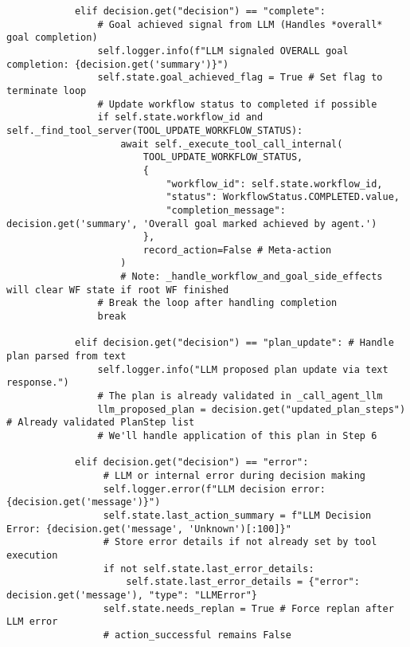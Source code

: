 \documentclass[12pt,a4paper]{article}
\begin{document}
\begin{pageablecode}
\begin{verbatim}
            elif decision.get("decision") == "complete":
                # Goal achieved signal from LLM (Handles *overall* goal completion)
                self.logger.info(f"LLM signaled OVERALL goal completion: {decision.get('summary')}")
                self.state.goal_achieved_flag = True # Set flag to terminate loop
                # Update workflow status to completed if possible
                if self.state.workflow_id and self._find_tool_server(TOOL_UPDATE_WORKFLOW_STATUS):
                    await self._execute_tool_call_internal(
                        TOOL_UPDATE_WORKFLOW_STATUS,
                        {
                            "workflow_id": self.state.workflow_id,
                            "status": WorkflowStatus.COMPLETED.value,
                            "completion_message": decision.get('summary', 'Overall goal marked achieved by agent.')
                        },
                        record_action=False # Meta-action
                    )
                    # Note: _handle_workflow_and_goal_side_effects will clear WF state if root WF finished
                # Break the loop after handling completion
                break

            elif decision.get("decision") == "plan_update": # Handle plan parsed from text
                self.logger.info("LLM proposed plan update via text response.")
                # The plan is already validated in _call_agent_llm
                llm_proposed_plan = decision.get("updated_plan_steps") # Already validated PlanStep list
                # We'll handle application of this plan in Step 6

            elif decision.get("decision") == "error":
                 # LLM or internal error during decision making
                 self.logger.error(f"LLM decision error: {decision.get('message')}")
                 self.state.last_action_summary = f"LLM Decision Error: {decision.get('message', 'Unknown')[:100]}"
                 # Store error details if not already set by tool execution
                 if not self.state.last_error_details:
                     self.state.last_error_details = {"error": decision.get('message'), "type": "LLMError"}
                 self.state.needs_replan = True # Force replan after LLM error
                 # action_successful remains False


\end{verbatim}
\end{pageablecode}
\end{document}
